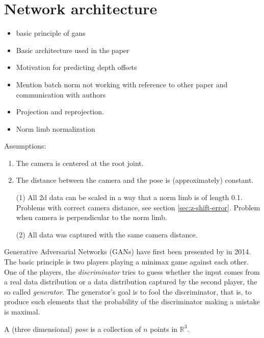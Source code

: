 \section{Network architecture}\label{sec:network}
\begin{itemize}
	\item basic principle of gans
	\item Basic architecture used in the paper
	\item Motivation for predicting depth offsets
	\item Mention batch norm not working with reference to other paper and communication with authors
	\item Projection and reprojection.
	\item Norm limb normalization
\end{itemize}

Assumptions:
\begin{enumerate}[label=(\Alph*)]
	\item The camera is centered at the root joint.
	\item The distance between the camera and the pose is (approximately) constant. 
\end{enumerate}
\begin{itemize}
	\item[(1)] All 2d data can be scaled in a way that a norm limb is of length 0.1. 
	Problems with correct camera distance, see section \ref{sec:z-shift-error}. 
	Problem when camera is perpendicular to the norm limb.
	\item[(2)] All data was captured with the same camera distance.
\end{itemize}

Generative Adversarial Networks (GANs) have first been presented by \citet{goodfellow14} in 2014.
The basic principle is two players playing a minimax game against each other.
One of the players, the \textit{discriminator} tries to guess whether the input comes from a real data distribution or a data distribution captured by the second player, the so called \textit{generator}. 
The generator's goal is to fool the discriminator, that is, to produce such elements that the probability of the discriminator making a mistake is maximal.



A (three dimensional) \textit{pose} is a collection of $n$ points in $\mathbb{R}^3$.

